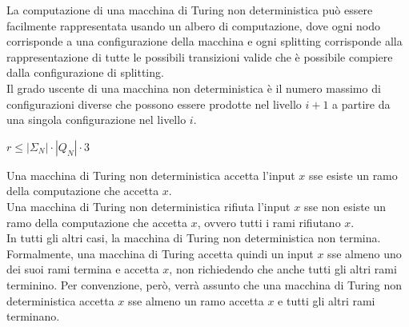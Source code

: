 La computazione di una macchina di Turing non deterministica può essere
facilmente rappresentata usando un albero di computazione, dove ogni
nodo corrisponde a una configurazione della macchina e ogni
splitting corrisponde alla rappresentazione di tutte le possibili transizioni
valide che è possibile compiere dalla configurazione di splitting.\\
Il grado uscente di una macchina non deterministica è il numero massimo di
configurazioni diverse che possono essere prodotte nel livello $i+1$ a
partire da una singola configurazione nel livello $i$.
\begin{center}
    $r \le |\Sigma_N| \cdot |Q_N| \cdot 3$
\end{center}

Una macchina di Turing non deterministica accetta l'input $x$ sse esiste un
ramo della computazione che accetta $x$.\\
Una macchina di Turing non deterministica rifiuta l'input $x$ sse non esiste
un ramo della computazione che accetta $x$, ovvero tutti i rami rifiutano $x$.\\
In tutti gli altri casi, la macchina di Turing non deterministica non termina.\\
Formalmente, una macchina di Turing accetta quindi un input $x$ sse almeno
uno dei suoi rami termina e accetta $x$, non richiedendo che anche tutti gli
altri rami terminino. Per convenzione, però, verrà assunto che una macchina
di Turing non deterministica accetta $x$ sse almeno un ramo accetta $x$ e
tutti gli altri rami terminano.

